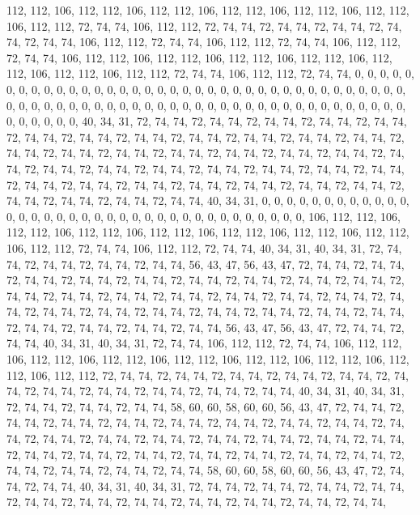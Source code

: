 112, 112, 106, 112, 112, 106, 112, 112, 106, 112, 112, 106, 112, 112, 106, 112, 112, 106, 112, 112, 72, 74, 74, 106, 112, 112, 72, 74, 74, 72, 74, 74, 72, 74, 74, 72, 74, 74, 72, 74, 74, 106, 112, 112, 72, 74, 74, 106, 112, 112, 72, 74, 74, 106, 112, 112, 72, 74, 74, 106, 112, 112, 106, 112,
112, 106, 112, 112, 106, 112, 112, 106, 112, 112, 106, 112, 112, 106, 112, 112, 72, 74, 74, 106, 112, 112, 72, 74, 74, 0, 0, 0, 0, 0, 0, 0, 0, 0, 0, 0, 0, 0, 0, 0, 0, 0, 0, 0, 0, 0, 0, 0, 0, 0, 0, 0, 0, 0, 0, 0, 0, 0, 0, 0, 0, 0, 0, 0,
0, 0, 0, 0, 0, 0, 0, 0, 0, 0, 0, 0, 0, 0, 0, 0, 0, 0, 0, 0, 0, 0, 0, 0, 0, 0, 0, 0, 0, 0, 0, 0, 0, 0, 0, 0, 40, 34, 31, 72, 74, 74, 72, 74, 74, 72, 74, 74, 72, 74, 74, 72, 74, 74, 72, 74, 74, 72, 74, 74, 72, 74, 74, 72,
74, 74, 72, 74, 74, 72, 74, 74, 72, 74, 74, 72, 74, 74, 72, 74, 74, 72, 74, 74, 72, 74, 74, 72, 74, 74, 72, 74, 74, 72, 74, 74, 72, 74, 74, 72, 74, 74, 72, 74, 74, 72, 74, 74, 72, 74, 74, 72, 74, 74, 72, 74, 74, 72, 74, 74, 72, 74, 74, 72, 74, 74, 72, 74,
74, 72, 74, 74, 72, 74, 74, 72, 74, 74, 72, 74, 74, 72, 74, 74, 72, 74, 74, 72, 74, 74, 72, 74, 74, 40, 34, 31, 0, 0, 0, 0, 0, 0, 0, 0, 0, 0, 0, 0, 0, 0, 0, 0, 0, 0, 0, 0, 0, 0, 0, 0, 0, 0, 0, 0, 0, 0, 0, 0, 0, 0, 0, 0,
106, 112, 112, 106, 112, 112, 106, 112, 112, 106, 112, 112, 106, 112, 112, 106, 112, 112, 106, 112, 112, 106, 112, 112, 72, 74, 74, 106, 112, 112, 72, 74, 74, 40, 34, 31, 40, 34, 31, 72, 74, 74, 72, 74, 74, 72, 74, 74, 72, 74, 74, 56, 43, 47, 56, 43, 47, 72, 74, 74, 72, 74, 74, 72,
74, 74, 72, 74, 74, 72, 74, 74, 72, 74, 74, 72, 74, 74, 72, 74, 74, 72, 74, 74, 72, 74, 74, 72, 74, 74, 72, 74, 74, 72, 74, 74, 72, 74, 74, 72, 74, 74, 72, 74, 74, 72, 74, 74, 72, 74, 74, 72, 74, 74, 72, 74, 74, 72, 74, 74, 72, 74, 74, 72, 74, 74, 72, 74,
74, 72, 74, 74, 72, 74, 74, 72, 74, 74, 72, 74, 74, 56, 43, 47, 56, 43, 47, 72, 74, 74, 72, 74, 74, 40, 34, 31, 40, 34, 31, 72, 74, 74, 106, 112, 112, 72, 74, 74, 106, 112, 112, 106, 112, 112, 106, 112, 112, 106, 112, 112, 106, 112, 112, 106, 112, 112, 106, 112, 112, 106, 112, 112,
72, 74, 74, 72, 74, 74, 72, 74, 74, 72, 74, 74, 72, 74, 74, 72, 74, 74, 72, 74, 74, 72, 74, 74, 72, 74, 74, 72, 74, 74, 72, 74, 74, 40, 34, 31, 40, 34, 31, 72, 74, 74, 72, 74, 74, 72, 74, 74, 58, 60, 60, 58, 60, 60, 56, 43, 47, 72, 74, 74, 72, 74, 74, 72,
74, 74, 72, 74, 74, 72, 74, 74, 72, 74, 74, 72, 74, 74, 72, 74, 74, 72, 74, 74, 72, 74, 74, 72, 74, 74, 72, 74, 74, 72, 74, 74, 72, 74, 74, 72, 74, 74, 72, 74, 74, 72, 74, 74, 72, 74, 74, 72, 74, 74, 72, 74, 74, 72, 74, 74, 72, 74, 74, 72, 74, 74, 72, 74,
74, 72, 74, 74, 72, 74, 74, 72, 74, 74, 58, 60, 60, 58, 60, 60, 56, 43, 47, 72, 74, 74, 72, 74, 74, 40, 34, 31, 40, 34, 31, 72, 74, 74, 72, 74, 74, 72, 74, 74, 72, 74, 74, 72, 74, 74, 72, 74, 74, 72, 74, 74, 72, 74, 74, 72, 74, 74, 72, 74, 74, 72, 74, 74,
